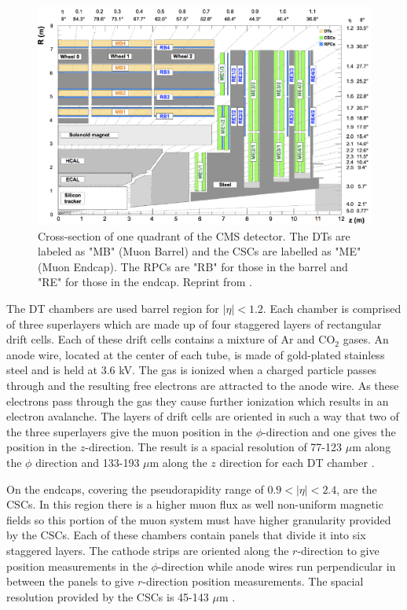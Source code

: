 \begin{figure}
	\centering
	\includegraphics[width=1.0\linewidth]{Figures/CMS-MUO-16-001_Figure_001}
	\caption{Cross-section of one quadrant of the CMS detector. The DTs are labeled as "MB" (Muon Barrel) and the CSCs are labelled as "ME" (Muon Endcap). The RPCs are "RB" for those in the barrel and "RE" for those in the endcap. Reprint from \cite{Sirunyan_2018}.}
	\label{fig:cms-muo-16-001figure001}
\end{figure}

The DT chambers are used barrel region for $|\eta|<1.2$.  Each chamber is comprised of three superlayers which are made up of four staggered layers of rectangular drift cells.  Each of these drift cells contains a mixture of Ar and CO$_2$ gases. An anode wire, located at the center of each tube, is made of gold-plated stainless steel and is held at 3.6 kV.  The gas is ionized when a charged particle passes through and the resulting free electrons are attracted to the anode wire. As these electrons pass through the gas they cause further ionization which results in an electron avalanche.  The layers of drift cells are oriented in such a way that two of the three superlayers give the muon position in the $\phi$-direction and one gives the position in the $z$-direction.  The result is a spacial resolution of 77-123 $\mu$m along the $\phi$ direction and 133-193 $\mu$m along the $z$ direction for each DT chamber \cite{muon_collaboration_2013}.

On the endcaps, covering the pseudorapidity range of $0.9<|\eta|<2.4$, are the CSCs.  In this region there is a higher muon flux as well non-uniform magnetic fields so this portion of the muon system must have higher granularity provided by the CSCs.  Each of these chambers contain panels that divide it into six staggered layers.  The cathode strips are oriented along the $r$-direction to give position measurements in the $\phi$-direction while anode wires run perpendicular in between the panels to give $r$-direction position measurements.  The spacial resolution provided by the CSCs is 45-143 $\mu$m \cite{Sirunyan_2018}.

